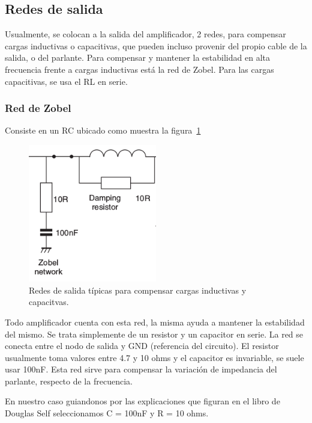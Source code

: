 \documentclass[a4paper,12pt,twoside]{article}
\begin{document}
\subsection{Redes de salida}

Usualmente, se colocan a la salida del amplificador, 2 redes, para compensar cargas inductivas o capacitivas, que pueden incluso provenir del propio cable de la salida, o del parlante. Para compensar y mantener la estabilidad en alta frecuencia frente a cargas inductivas está la red de Zobel. Para las cargas capacitivas, se usa el RL en serie.

\subsubsection{Red de Zobel}

Consiste en un RC ubicado como muestra la figura~\ref{fig:output-networks}

\begin{figure}[H]
\centering
\includegraphics[width=0.5\textwidth]{img/output-networks}
\caption{Redes de salida típicas para compensar cargas inductivas y capacitvas.}
\label{fig:output-networks} 
\end{figure}

Todo amplificador cuenta con esta red, la misma ayuda a mantener la estabilidad del mismo. Se trata simplemente de un resistor y un capacitor
en serie. La red se conecta entre el nodo de salida y GND (referencia del circuito).
El resistor usualmente toma valores entre 4.7 y 10 ohms y el capacitor es invariable, se suele usar 100nF.
Esta red sirve para compensar la variación de impedancia del parlante, respecto de la frecuencia. 

En nuestro caso guiandonos por las explicaciones que figuran en el libro de Douglas Self seleccionamos C = 100nF y R = 10 ohms. 
\end{document}
